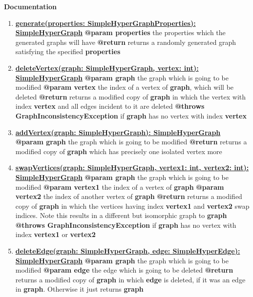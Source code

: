 \documentclass{article}
\begin{document}
	\textbf{Documentation}
	\begin{enumerate}[+]
		\item{
			\textbf{\underline{generate(properties: SimpleHyperGraphProperties): SimpleHyperGraph}} \newline
			\textbf{@param properties} the properties which the generated graphs will have \newline
			\textbf{@return} returns a randomly generated graph satisfying the specified \textbf{properties}
		}
		\item{
			\textbf{\underline{deleteVertex(graph: SimpleHyperGraph, vertex: int): SimpleHyperGraph}} \newline
			\textbf{@param graph} the graph which is going to be modified \newline
			\textbf{@param vertex} the index of a vertex of \textbf{graph}, which will be deleted \newline
			\textbf{@return} returns a modified copy of \textbf{graph} in which the vertex with index \textbf{vertex} and all edges incident to it are deleted \newline
			\textbf{@throws GraphInconsistencyException} if \textbf{graph} has no vertex with index \textbf{vertex} 
		}
		\item{
			\textbf{\underline{addVertex(graph: SimpleHyperGraph): SimpleHyperGraph}} \newline
			\textbf{@param graph} the graph which is going to be modified \newline
			\textbf{@return} returns a modified copy of \textbf{graph} which has precisely one isolated vertex more
		}
		\item{
			\textbf{\underline{swapVertices(graph: SimpleHyperGraph, vertex1: int, vertex2: int): SimpleHyperGraph}} \newline
			\textbf{@param graph} the graph which is going to be modified \newline
			\textbf{@param vertex1} the index of a vertex of \textbf{graph} \newline
			\textbf{@param vertex2} the index of another vertex of \textbf{graph} \newline
			\textbf{@return} returns a modified copy of \textbf{graph} in which the vertices having index \textbf{vertex1} and \textbf{vertex2} swap indices. Note this results in a different but isomorphic graph to \textbf{graph}  \newline
			\textbf{@throws GraphInconsistencyException} if \textbf{graph} has no vertex with index \textbf{vertex1} or \textbf{vertex2} 
		}
		\item{
			\textbf{\underline{deleteEdge(graph: SimpleHyperGraph, edge: SimpleHyperEdge): SimpleHyperGraph}} \newline
			\textbf{@param graph} the graph which is going to be modified \newline
			\textbf{@param edge} the edge which is going to be deleted \newline
			\textbf{@return} returns a modified copy of \textbf{graph} in which \textbf{edge} is deleted, if it was an edge in \textbf{graph}. Otherwise it just returns \textbf{graph}
		}
		

\end{enumerate}
\end{document}
